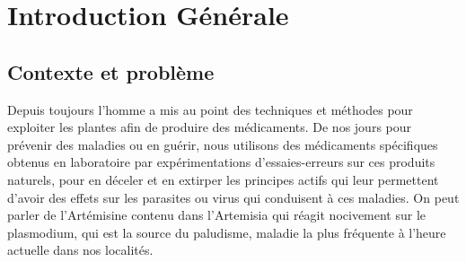 \chapter{Introduction Générale}

\section{Contexte et problème}

Depuis toujours l'homme a mis au point des techniques et méthodes pour exploiter les plantes afin de produire des médicaments.
De nos jours pour prévenir des maladies ou en guérir, nous utilisons des médicaments spécifiques obtenus en laboratoire par expérimentations d'essaies-erreurs sur ces produits naturels, pour en déceler et en extirper les principes actifs qui leur permettent d'avoir des effets sur les parasites ou virus qui conduisent à ces maladies.
On peut parler de l'Artémisine contenu dans l'Artemisia qui réagit nocivement sur le plasmodium, qui est la source du paludisme, maladie la plus fréquente à l'heure actuelle dans nos localités.

